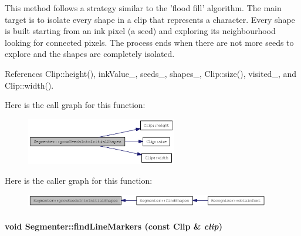 This method follows a strategy similar to the 'flood fill' algorithm. The main target is to isolate every shape in a clip that represents a character. Every shape is built starting from an ink pixel (a seed) and exploring its neighbourhood looking for connected pixels. The process ends when there are not more seeds to explore and the shapes are completely isolated. 

References Clip::height(), inkValue\_\-, seeds\_\-, shapes\_\-, Clip::size(), visited\_\-, and Clip::width().

Here is the call graph for this function:\nopagebreak
\begin{figure}[H]
\begin{center}
\leavevmode
\includegraphics[width=187pt]{class_segmenter_72c007e345fad7abbf6e9d4edb615a50_cgraph}
\end{center}
\end{figure}


Here is the caller graph for this function:\nopagebreak
\begin{figure}[H]
\begin{center}
\leavevmode
\includegraphics[width=304pt]{class_segmenter_72c007e345fad7abbf6e9d4edb615a50_icgraph}
\end{center}
\end{figure}
\hypertarget{class_segmenter_ad8893282742e811dd7fff172ec03c85}{
\paragraph[findLineMarkers]{\setlength{\rightskip}{0pt plus 5cm}void Segmenter::findLineMarkers (const {\bf Clip} \& {\em clip})}\hfill}
\label{class_segmenter_ad8893282742e811dd7fff172ec03c85}


